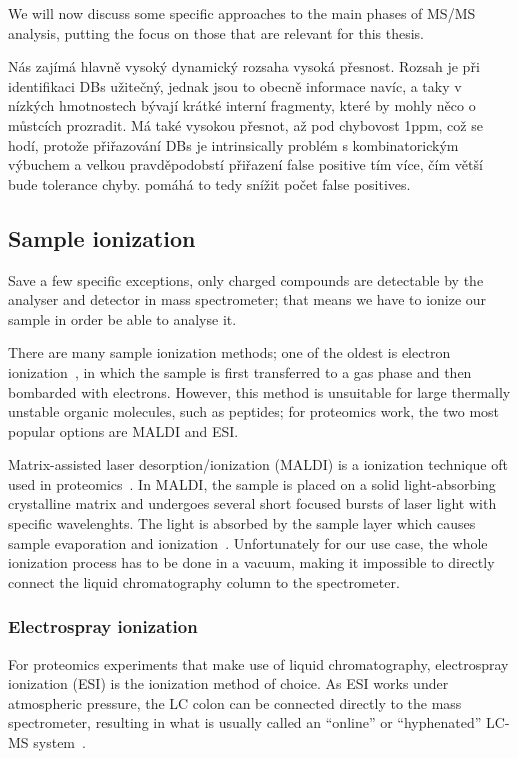 We will now discuss some specific approaches to the main phases of MS/MS analysis, putting the focus on those that are relevant for this thesis.

Nás zajímá hlavně vysoký dynamický rozsaha  vysoká přesnost.  Rozsah je při identifikaci DBs užitečný, jednak jsou to obecně informace navíc, a taky v nízkých hmotnostech bývají krátké interní fragmenty, které by mohly něco o můstcích prozradit. Má také vysokou přesnot, až pod chybovost 1ppm, což se hodí, protože přiřazování DBs je intrinsically problém s kombinatorickým výbuchem a velkou pravděpodobstí přiřazení false positive tím více, čím větší bude tolerance chyby. pomáhá to tedy snížit počet false positives.

\subsection{Sample ionization}

Save a few specific exceptions, only charged compounds are detectable by the analyser and detector in mass spectrometer; that means we have to ionize our sample in order be able to analyse it.

There are many sample ionization methods; one of the oldest is electron ionization~\cite{field2013electron}, in which the sample is first transferred to a gas phase and then bombarded with electrons. However, this method is unsuitable for large thermally unstable organic molecules, such as peptides; for proteomics work, the two most popular options are MALDI and ESI.\@

Matrix-assisted laser desorption/ionization (MALDI) is a ionization technique oft used in proteomics~\cite{caprioli1997molecular, ross1997discrimination}. In MALDI, the sample is placed on a solid light-absorbing crystalline matrix and undergoes several short focused bursts of laser light with specific wavelenghts. The light is absorbed by the sample layer which causes sample evaporation and ionization~\cite{karas1985influence}. Unfortunately for our use case, the whole ionization process has to be done in a vacuum, making it impossible to directly connect the liquid chromatography column to the spectrometer.

\subsubsection{Electrospray ionization}

For proteomics experiments that make use of liquid chromatography, electrospray ionization (ESI) is the ionization method of choice. As ESI works under atmospheric pressure, the LC colon can be connected directly to the mass spectrometer, resulting in what is usually called an  ``online'' or ``hyphenated'' LC-MS system~\cite{opiteck1997comprehensive}.

